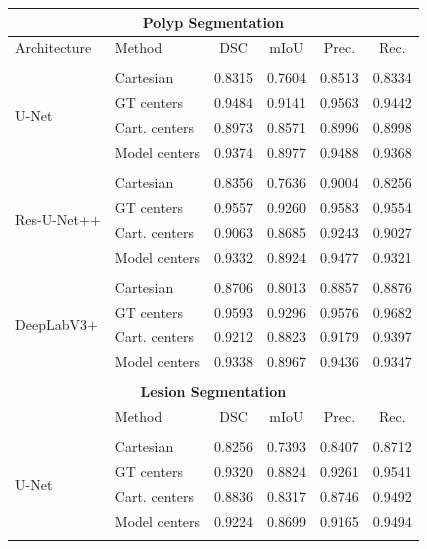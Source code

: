 \begin{table}[t!]
\centering
\def\arraystretch{1.2}
\begin{tabularx}{\textwidth}{X X c c c c} 
 \\ [-2ex]

 \multicolumn{6}{c}{\textbf{Polyp Segmentation}}\\[1ex]
 \hline
 Architecture & Method & DSC & mIoU & Prec. & Rec. \\ 
 \hline \\ [-1.5ex]
 
 \multirow{4}{7em}{{U-Net}}
& Cartesian & 0.8315 & 0.7604 & 0.8513 & 0.8334 \\
& GT centers & 0.9484 & 0.9141 & 0.9563 & 0.9442 \\
& Cart. centers & 0.8973 & 0.8571 & 0.8996 & 0.8998 \\
& Model centers & 0.9374 & 0.8977 & 0.9488 & 0.9368 \\ [1ex]
\hline \\ [-1.5ex]

 \multirow{4}{7em}{{Res-U-Net++}}
& Cartesian & 0.8356 & 0.7636 & 0.9004 & 0.8256 \\
& GT centers & 0.9557 & 0.9260 & 0.9583 & 0.9554 \\
& Cart. centers & 0.9063 & 0.8685 & 0.9243 & 0.9027 \\
& Model centers & 0.9332 & 0.8924 & 0.9477 & 0.9321 \\ [1ex]
\hline \\ [-1.5ex]

 \multirow{4}{7em}{{DeepLabV3+}}
& Cartesian & 0.8706 & 0.8013 & 0.8857 & 0.8876 \\
& GT centers & 0.9593 & 0.9296 & 0.9576 & 0.9682 \\
& Cart. centers & 0.9212 & 0.8823 & 0.9179 & 0.9397 \\
& Model centers & 0.9338 & 0.8967 & 0.9436 & 0.9347 \\ [1ex]
\hline \\ [-1.5ex]

\multicolumn{6}{c}{\textbf{Lesion Segmentation}}\\[1ex]
 \hline
  & Method & DSC & mIoU & Prec. & Rec. \\ 
 \hline \\ [-1.5ex]
 
 \multirow{4}{7em}{{U-Net}}
& Cartesian & 0.8256 & 0.7393 & 0.8407 & 0.8712 \\
& GT centers & 0.9320 & 0.8824 & 0.9261 & 0.9541 \\
& Cart. centers & 0.8836 & 0.8317 & 0.8746 & 0.9492 \\
& Model centers & 0.9224 & 0.8699 & 0.9165 & 0.9494 \\ [1ex]
\hline \\ [-1.5ex]


\end{tabularx}
\end{table}
